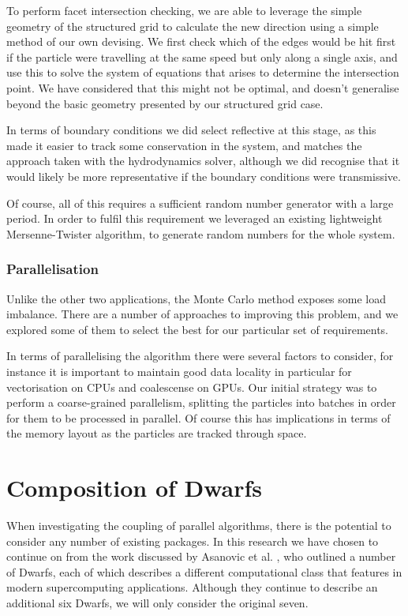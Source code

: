 \documentclass[runningheads,a4paper]{llncs}
\begin{document}
To perform facet intersection checking, we are able to leverage the simple geometry of the structured grid to calculate the new direction using a simple method of our own devising. We first check which of the edges would be hit first if the particle were travelling at the same speed but only along a single axis, and use this to solve the system of equations that arises to determine the intersection point. We have considered that this might not be optimal, and doesn't generalise beyond the basic geometry presented by our structured grid case.

In terms of boundary conditions we did select reflective at this stage, as this made it easier to track some conservation in the system, and matches the approach taken with the hydrodynamics solver, although we did recognise that it would likely be more representative if the boundary conditions were transmissive.

Of course, all of this requires a sufficient random number generator with a large period. In order to fulfil this requirement we leveraged an existing lightweight Mersenne-Twister algorithm, to generate random numbers for the whole system.

\subsubsection{Parallelisation}

Unlike the other two applications, the Monte Carlo method exposes some load imbalance. There are a number of approaches to improving this problem, and we explored some of them to select the best for our particular set of requirements. 

In terms of parallelising the algorithm there were several factors to consider, for instance it is important to maintain good data locality in particular for vectorisation on CPUs and coalescense on GPUs. Our initial strategy was to perform a coarse-grained parallelism, splitting the particles into batches in order for them to be processed in parallel. Of course this has implications in terms of the memory layout as the particles are tracked through space.

\section{Composition of Dwarfs}

When investigating the coupling of parallel algorithms, there is the potential to consider any number of existing packages. In this research we have chosen to continue on from the work discussed by Asanovic et al. \cite{Asanovic2006}, who outlined a number of Dwarfs, each of which describes a different computational class that features in modern supercomputing applications. Although they continue to describe an additional six Dwarfs, we will only consider the original seven.
\end{document}
